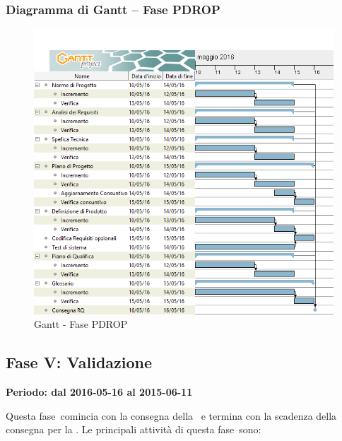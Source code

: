 \documentclass[../PianoProgetto.tex]{subfiles}
\begin{document}
		\subsubsection{Diagramma di Gantt – Fase PDROP}
			\begin{figure}[!h]
				\centering
				\includegraphics[width=\textwidth]{gantt_png/6-requisiti_facoltativi}
				\caption{Gantt - Fase PDROP}
				\label{fig:Gantt - Fase PDROP}
			\end{figure}
			
\newpage
	\subsection{Fase V: Validazione}
		\textbf{Periodo: dal 2016-05-16 al 2015-06-11}
		
		Questa fase\g\ comincia con la consegna della \revisionediqualifica\ e termina con la scadenza della consegna per la \revisionediaccettazione . Le principali attività di questa fase\g\ sono:
\end{document}
